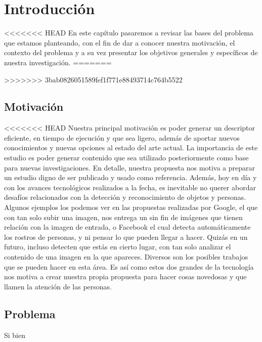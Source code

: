 \chapter[Introducción]{Introducción}\label{ch:capitulo1}
<<<<<<< HEAD
En este capítulo pasaremos a revisar las bases del problema que estamos planteando, con el fin de dar a conocer nuestra motivación, el contexto del problema y a su vez presentar los objetivos generales y específicos de nuestra investigación.
=======

>>>>>>> 3bab0826051589fef1f771e88493714c764b5522


\section{Motivación}\label{chsub:Motivación}

<<<<<<< HEAD
Nuestra principal motivación es poder generar un descriptor eficiente, en tiempo de ejecución y que sea ligero, además de aportar nuevos conocimientos y nuevas opciones al estado del arte actual. La importancia de este estudio es poder generar contenido que sea utilizado posteriormente como base para nuevas investigaciones. En detalle, nuestra propuesta nos motiva a preparar un estudio digno de ser publicado y usado como referencia. Además, hoy en día y con los avances tecnológicos realizados a la fecha, es inevitable no querer abordar desafíos relacionados con la detección y reconocimiento de objetos y personas. Algunos ejemplos los podemos ver en las propuestas realizadas por Google, el que con tan solo subir una imagen, nos entrega un sin fin de imágenes que tienen relación con la imagen de entrada, o Facebook el cual detecta automáticamente los rostros de personas, y ni pensar lo que pueden llegar a hacer. Quizás en un futuro, incluso detecten que estás en cierto lugar, con tan solo analizar el contenido de una imagen en la que apareces. Diversos son los posibles trabajos que se pueden hacer en esta área. Es así como estos dos grandes de la tecnología nos motiva a crear nuestra propia propuesta para hacer cosas novedosas y que llamen la atención de las personas.

\section{Problema}\label{sec:problema}
Si bien 
